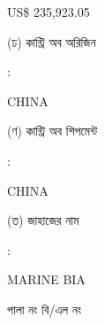 \documentclass[12pt]{article}
\newcommand{\price}{US\$ 235,923.05}
\newcommand{\co}{CHINA}
\newcommand{\coship}{CHINA}
\newcommand{\vessel}{MARINE BIA}
\begin{document}
\begin{minipage}[t]{0.53\linewidth}
{\price}
\\
\end{minipage}
\begin{minipage}[t]{0.05\linewidth}
\hspace*{1em}
\end{minipage}
\begin{minipage}[t]{0.40\linewidth}
(ঢ) কান্ট্রি অব অরিজিন
\end{minipage}
\begin{minipage}[t]{0.02\linewidth}
:
\end{minipage}
\begin{minipage}[t]{0.53\linewidth}
{\co}
\\
\end{minipage}
\begin{minipage}[t]{0.05\linewidth}
\hspace*{1em}
\end{minipage}
\begin{minipage}[t]{0.40\linewidth}
(ণ) কান্ট্রি অব শিপমেন্ট
\end{minipage}
\begin{minipage}[t]{0.02\linewidth}
:
\end{minipage}
\begin{minipage}[t]{0.53\linewidth}
{\coship}
\\
\end{minipage}
\begin{minipage}[t]{0.05\linewidth}
\hspace*{1em}
\end{minipage}
\begin{minipage}[t]{0.40\linewidth}
(ত) জাহাজের নাম
\end{minipage}
\begin{minipage}[t]{0.02\linewidth}
:
\end{minipage}
\begin{minipage}[t]{0.53\linewidth}
{\vessel}
\end{minipage}
\begin{minipage}[t]{0.05\linewidth}
\hspace*{1em}
\end{minipage}
\begin{minipage}[t]{0.40\linewidth}
\hspace*{1.8em}পালা নং বি/এল নং
\end{minipage}
\begin{minipage}[t]{0.02\linewidth}
\hspace{1em}
\end{minipage}
\end{document}
